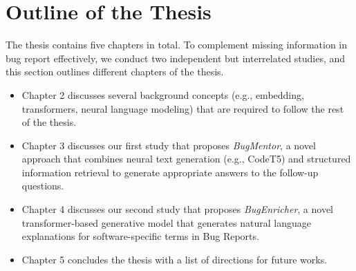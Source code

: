 \section{Outline of the Thesis}

The thesis contains five chapters in total.
To complement missing information in bug report effectively, we conduct two independent but interrelated studies, and this section outlines different chapters of the thesis.

\begin{itemize}
    \item Chapter 2 discusses several background concepts (e.g., embedding, transformers, neural language modeling) that are required to follow the rest of the thesis.

    \item Chapter 3 discusses our first study that proposes \textit{BugMentor}, a novel approach that combines neural text generation (e.g., CodeT5) and structured information retrieval to generate appropriate answers to the follow-up questions.

    \sloppy
    \item Chapter 4 discusses our second study that proposes \emph{BugEnricher}, a novel transformer-based generative model that generates natural language explanations for software-specific terms in Bug Reports.

    \item Chapter 5 concludes the thesis with a list of directions for future works.
\end{itemize}